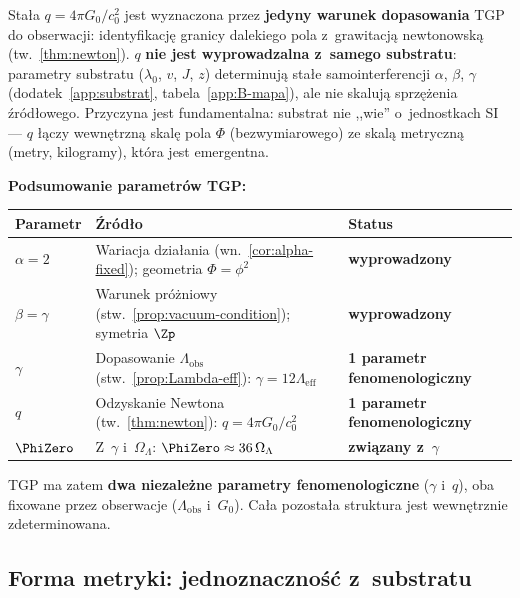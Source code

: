 \begin{remark}\label{rem:q-status}
Sta\l{}a $q = 4\pi G_0/c_0^2$ jest wyznaczona
przez \textbf{jedyny warunek dopasowania} TGP do obserwacji:
identyfikacj\k{e} granicy dalekiego pola z~grawitacj\k{a}
newtonowsk\k{a} (tw.~\ref{thm:newton}).
$q$ \textbf{nie jest wyprowadzalna z~samego substratu}:
parametry substratu ($\lambda_0$, $v$, $J$, $z$) determinuj\k{a}
sta\l{}e samointerferencji $\alpha$, $\beta$, $\gamma$
(dodatek~\ref{app:substrat}, tabela~\ref{app:B-mapa}),
ale nie skaluj\k{a} sprz\k{e}\.zenia \'zr\'od\l{}owego.
Przyczyna jest fundamentalna: substrat nie ,,wie'' o~jednostkach
SI --- $q$ \l{}\k{a}czy wewn\k{e}trzn\k{a} skal\k{e} pola $\Phi$
(bezwymiarowego) ze skal\k{a} metryczn\k{a} (metry, kilogramy),
kt\'ora jest emergentna.

\medskip\noindent
\textbf{Podsumowanie parametr\'ow TGP:}
\begin{center}\small
\begin{tabular}{@{}lp{7cm}l@{}}
\toprule
\textbf{Parametr} & \textbf{\'Zr\'od\l{}o} & \textbf{Status} \\
\midrule
$\alpha = 2$ & Wariacja dzia\l{}ania
  (wn.~\ref{cor:alpha-fixed}); geometria $\Phi = \phi^2$
  & \textbf{wyprowadzony} \\
$\beta = \gamma$ & Warunek pr\'o\.zniowy
  (stw.~\ref{prop:vacuum-condition}); symetria $\Zp$
  & \textbf{wyprowadzony} \\
$\gamma$ & Dopasowanie $\Lambda_{\mathrm{obs}}$
  (stw.~\ref{prop:Lambda-eff}): $\gamma = 12\Lambda_{\mathrm{eff}}$
  & \textbf{1 parametr fenomenologiczny} \\
$q$ & Odzyskanie Newtona (tw.~\ref{thm:newton}):
  $q = 4\pi G_0/c_0^2$
  & \textbf{1 parametr fenomenologiczny} \\
$\PhiZero$ & Z~$\gamma$ i~$\Omega_\Lambda$:
  $\PhiZero \approx 36\,\Omega_\Lambda$
  & \textbf{zwi\k{a}zany z~$\gamma$} \\
\bottomrule
\end{tabular}
\end{center}
TGP ma zatem \textbf{dwa niezale\.zne parametry fenomenologiczne}
($\gamma$ i~$q$), oba fixowane przez obserwacje ($\Lambda_{\mathrm{obs}}$
i~$G_0$). Ca\l{}a pozosta\l{}a struktura jest wewn\k{e}trznie
zdeterminowana.
\end{remark}

\subsection{Forma metryki: jednoznaczno\'s\'c z~substratu}%
\label{ssec:metryka-forma}

